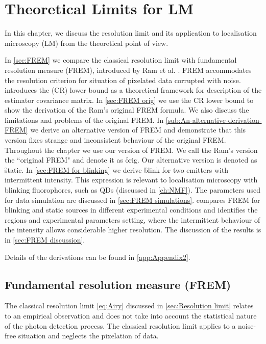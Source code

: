 \chapter{Theoretical Limits for LM \label{ch:Theoretical-limits-of the LM}}

In this chapter, we discuss the resolution limit and its application to localisation microscopy (LM) from the theoretical point of view. 

In \autoref{sec:FREM} we compare the classical resolution limit with fundamental resolution measure (FREM), introduced by Ram et al. \cite{Ram2006}. FREM accommodates the resolution criterion for situation of pixelated data corrupted with noise.  introduces the \CR (CR) lower bound as a theoretical framework for description of the estimator covariance matrix. In \autoref{sec:FREM orig} we use the CR lower bound to show the derivation of the Ram's original FREM formula. We also discuss the limitations and problems of the original FREM. In \autoref{sub:An-alternative-derivation-FREM} we derive an alternative version of FREM and demonstrate that this version fixes strange and inconsistent behaviour of the original FREM. Throughout the chapter we use our version of FREM. We call the Ram's version the ``original FREM" and denote it as \f{orig}. Our alternative version is denoted as \f{static}. In \autoref{sec:FREM for blinking} we derive \f{blink} for two emitters with intermittent intensity. This expression is relevant to localisation microscopy with blinking fluorophores, such as QDs (discussed in \autoref{ch:NMF}). The parameters used for data simulation are discussed in \autoref{sec:FREM simulations}.  compares FREM for blinking and static sources in different experimental conditions and identifies the regions and experimental parameters setting, where the intermittent behaviour of the intensity allows considerable higher resolution. The discussion of the results is in \autoref{sec:FREM discussion}. 

Details of the derivations can be found in \autoref{app:Appendix2}.
\afterpage{\clearpage}

\section{Fundamental resolution measure (FREM)\label{sec:FREM}}

The classical resolution limit \autoref{eq:Airy} discussed in \autoref{sec:Resolution limit} relates to an empirical observation and does not take into account the statistical nature of the photon detection process. The classical resolution limit applies to a noise-free situation and neglects the pixelation of data. 

